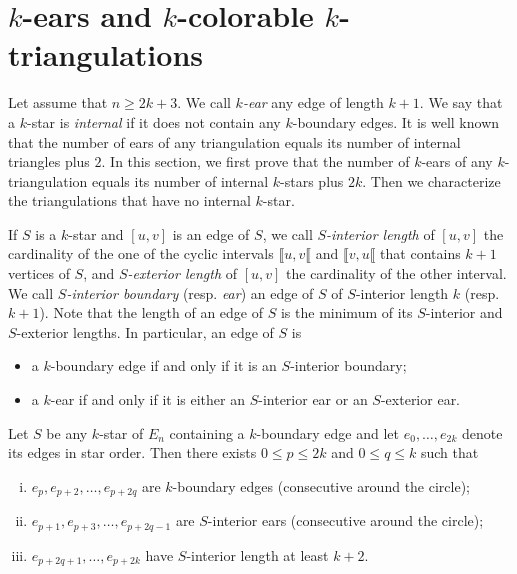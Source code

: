 \documentclass[12pt]{amsart}
\begin{document}


\section{$k$-ears and $k$-colorable $k$-triangulations}\label{sectionears}


Let assume that $n\ge 2k+3$. We call \emph{$k$-ear} any edge of length $k+1$. We say that a $k$-star is \emph{internal} if it does not contain any $k$-boundary edges.
It is well known that the number of ears of any triangulation equals its number of internal triangles plus $2$. In this section, we first prove that the number of $k$-ears of any $k$-triangulation equals its number of internal $k$-stars plus $2k$. Then we characterize the triangulations that have no internal $k$-star.

If $S$ is a $k$-star and $[u,v]$ is an edge of $S$, we call \emph{$S$-interior length} of $[u,v]$ the cardinality of the one of the cyclic intervals $\llbracket u,v\llbracket$ and $\llbracket v,u\llbracket$ that contains $k+1$ vertices of $S$, and \emph{$S$-exterior length} of $[u,v]$ the cardinality of the other interval.
We call \emph{$S$-interior boundary} (resp. \emph{ear}) an edge of $S$ of $S$-interior length $k$ (resp. $k+1$).
Note that the length of an edge of $S$ is the minimum of its $S$-interior and $S$-exterior lengths. In particular, an edge of $S$ is 
\begin{itemize}
\item a $k$-boundary edge if and only if it is an $S$-interior boundary;
\item a $k$-ear  if and only if it is either an $S$-interior ear or an $S$-exterior ear.
\end{itemize}

\begin{lemma}\label{starwithboundary}
Let $S$ be any $k$-star of $E_n$ containing a $k$-boundary edge and let $e_0,\ldots,e_{2k}$ denote its edges in star order. Then there exists $0\le p\le 2k$ and $0\le q\le k$ such that
\begin{enumerate}[(i)]
\item $e_p,e_{p+2},\ldots,e_{p+2q}$ are $k$-boundary edges (consecutive around the circle);
\item $e_{p+1},e_{p+3},\ldots,e_{p+2q-1}$ are $S$-interior ears (consecutive around the circle);
\item $e_{p+2q+1},\ldots,e_{p+2k}$ have $S$-interior length at least $k+2$.
\end{enumerate}
\end{lemma}
\end{document}
